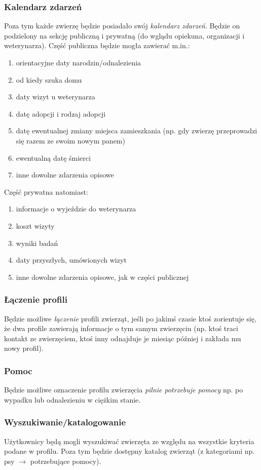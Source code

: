 \documentclass[10pt,a4paper]{article}
\begin{document}
\subsubsection{Kalendarz zdarzeń}
\label{s_kalendarz_zdarzen}
Poza tym każde zwierzę będzie posiadało swój \emph{kalendarz zdarzeń}. Będzie on podzielony na sekcję publiczną i prywatną (do wglądu opiekuna, organizacji i weterynarza). Część publiczna będzie mogła zawierać m.in.:
\begin{enumerate}
	\item orientacyjne daty narodzin/odnalezienia
	\item od kiedy szuka domu
	\item daty wizyt u weterynarza
	\item datę adopcji i rodzaj adopcji
	\item datę ewentualnej zmiany miejsca zamieszkania (np. gdy zwierzę przeprowadzi się razem ze swoim nowym panem)
	\item ewentualną datę śmierci
	\item inne dowolne zdarzenia opisowe
\end{enumerate}
Część prywatna natomiast:
\begin{enumerate}
	\item informacje o wyjeździe do weterynarza
	\item koszt wizyty
	\item wyniki badań
	\item daty przyszłych, umówionych wizyt
	\item inne dowolne zdarzenia opisowe, jak w części publicznej
\end{enumerate}
\subsubsection{Łączenie profili}
Będzie możliwe \emph{łączenie} profili zwierząt, jeśli po jakimś czasie ktoś zorientuje się, że dwa profile zawierają informacje o tym samym zwierzęciu (np. ktoś traci kontakt ze zwierzęciem, ktoś inny odnajduje je miesiąc później i zakłada mu nowy profil).
\subsubsection{Pomoc}
Będzie możliwe oznaczenie profilu zwierzęcia \emph{pilnie potrzebuje pomocy} np. po wypadku lub odnalezieniu w ciężkim stanie.

\subsubsection{Wyszukiwanie/katalogowanie}
Użytkownicy będą mogli wyszukiwać zwierzęta ze względu na wszystkie kryteria podane w profilu. Poza tym będzie dostępny katalog zwierząt (z kategoriami np. psy $\rightarrow$ potrzebujące pomocy).
 
\end{document}
